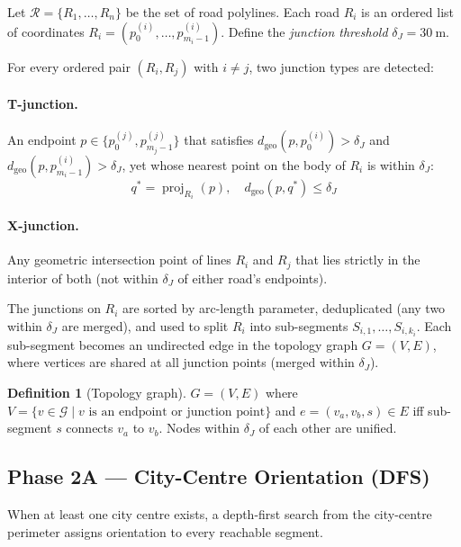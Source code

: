 \documentclass[12pt,a4paper]{article}
\theoremstyle{definition}
\newtheorem{definition}{Definition}[section]
\theoremstyle{plain}
\theoremstyle{remark}
\DeclareMathOperator{\proj}{proj}
\begin{document}
Let $\mathcal{R} = \{R_1, \ldots, R_n\}$ be the set of road polylines.
Each road $R_i$ is an ordered list of coordinates
$R_i = (p_0^{(i)}, \ldots, p_{m_i-1}^{(i)})$.
Define the \emph{junction threshold} $\delta_J = 30\ \mathrm{m}$.

For every ordered pair $(R_i, R_j)$ with $i \neq j$, two junction types are detected:

\paragraph{T-junction.}
An endpoint $p \in \{p_0^{(j)}, p_{m_j-1}^{(j)}\}$ that satisfies
$d_{\text{geo}}(p, p_0^{(i)}) > \delta_J$ and
$d_{\text{geo}}(p, p_{m_i-1}^{(i)}) > \delta_J$, yet whose nearest point
on the body of $R_i$ is within $\delta_J$:
\begin{equation}
  q^* = \proj_{R_i}(p), \quad d_{\text{geo}}(p, q^*) \leq \delta_J
  \label{eq:t_junction}
\end{equation}

\paragraph{X-junction.}
Any geometric intersection point of lines $R_i$ and $R_j$ that lies strictly
in the interior of both (not within $\delta_J$ of either road's endpoints).

The junctions on $R_i$ are sorted by arc-length parameter, deduplicated
(any two within $\delta_J$ are merged), and used to split $R_i$ into
sub-segments $S_{i,1}, \ldots, S_{i,k_i}$. Each sub-segment becomes an
undirected edge in the topology graph $G = (V, E)$, where vertices are
shared at all junction points (merged within $\delta_J$).

\begin{definition}[Topology graph]
$G = (V, E)$ where
$V = \{v \in \mathcal{G} \mid v \text{ is an endpoint or junction point}\}$
and $e = (v_a, v_b, s) \in E$ iff sub-segment $s$ connects $v_a$ to $v_b$.
Nodes within $\delta_J$ of each other are unified.
\end{definition}

\subsection{Phase 2A — City-Centre Orientation (DFS)}

When at least one city centre exists, a depth-first search from the
city-centre perimeter assigns orientation to every reachable segment.
\end{document}
